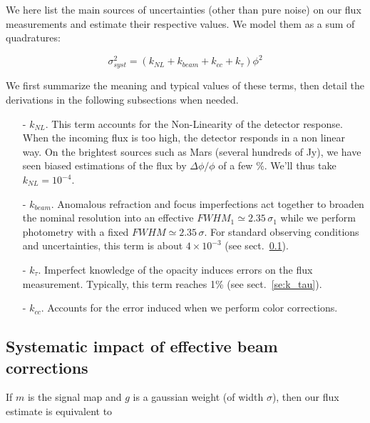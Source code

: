 

We here list the main sources of uncertainties (other than pure noise) on our flux measurements and
estimate their respective values. We model them as a sum of quadratures:

\begin{equation}
\sigma_{syst}^2 = (k_{NL} + k_{beam} + k_{cc} + k_\tau)\phi^2
\end{equation}

We first summarize the meaning and typical values of these terms, then detail
the derivations in the following subsections when needed.

\begin{itemize}
\item[-] $k_{NL}$. This term accounts for the Non-Linearity of the detector response. When the incoming flux is too
  high, the detector responds in a non linear way. On the brightest sources
  such as Mars (several hundreds of Jy), we have seen biased estimations of the
  flux by $\Delta\phi/\phi$ of a few \%. We'll thus take $k_{NL}=10^{-4}$.
\item[-] $k_{beam}$. Anomalous refraction and focus imperfections act together to
  broaden the nominal resolution into an effective $FWHM_1 \simeq 2.35\,\sigma_1$ while we perform
  photometry with a fixed $FWHM \simeq 2.35\,\sigma$. For standard observing
  conditions and uncertainties, this term is about $4\times 10^{-3}$ (see
  sect.~\ref{se:k_beam}).
\item[-] $k_\tau$. Imperfect knowledge of the opacity induces errors on the flux
  measurement. Typically, this term reaches 1\% (see sect.~\ref{se:k_tau}).
\item[-] $k_{cc}$. Accounts for the error induced when we perform color
  corrections. 
\end{itemize}


\subsection{Systematic impact of effective beam corrections}
\label{se:k_beam}

 If $m$ is the signal map and $g$ is
  a gaussian weight (of width $\sigma$), then our flux estimate is equivalent to

